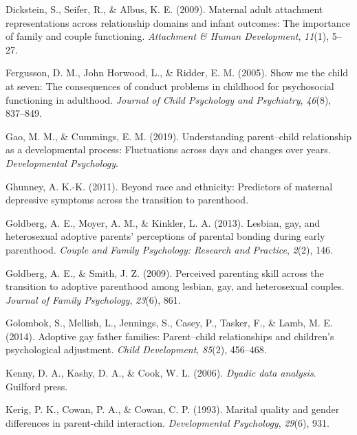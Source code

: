 \documentclass[man]{apa6}
\begin{document}
\leavevmode\hypertarget{ref-dickstein2009maternal}{}%
Dickstein, S., Seifer, R., \& Albus, K. E. (2009). Maternal adult attachment representations across relationship domains and infant outcomes: The importance of family and couple functioning. \emph{Attachment \& Human Development}, \emph{11}(1), 5--27.

\leavevmode\hypertarget{ref-fergusson2005show}{}%
Fergusson, D. M., John Horwood, L., \& Ridder, E. M. (2005). Show me the child at seven: The consequences of conduct problems in childhood for psychosocial functioning in adulthood. \emph{Journal of Child Psychology and Psychiatry}, \emph{46}(8), 837--849.

\leavevmode\hypertarget{ref-gao2019understanding}{}%
Gao, M. M., \& Cummings, E. M. (2019). Understanding parent--child relationship as a developmental process: Fluctuations across days and changes over years. \emph{Developmental Psychology}.

\leavevmode\hypertarget{ref-ghunney2011beyond}{}%
Ghunney, A. K.-K. (2011). Beyond race and ethnicity: Predictors of maternal depressive symptoms across the transition to parenthood.

\leavevmode\hypertarget{ref-goldberg2013lesbian}{}%
Goldberg, A. E., Moyer, A. M., \& Kinkler, L. A. (2013). Lesbian, gay, and heterosexual adoptive parents' perceptions of parental bonding during early parenthood. \emph{Couple and Family Psychology: Research and Practice}, \emph{2}(2), 146.

\leavevmode\hypertarget{ref-goldberg2009perceived}{}%
Goldberg, A. E., \& Smith, J. Z. (2009). Perceived parenting skill across the transition to adoptive parenthood among lesbian, gay, and heterosexual couples. \emph{Journal of Family Psychology}, \emph{23}(6), 861.

\leavevmode\hypertarget{ref-golombok2014adoptive}{}%
Golombok, S., Mellish, L., Jennings, S., Casey, P., Tasker, F., \& Lamb, M. E. (2014). Adoptive gay father families: Parent--child relationships and children's psychological adjustment. \emph{Child Development}, \emph{85}(2), 456--468.

\leavevmode\hypertarget{ref-apim}{}%
Kenny, D. A., Kashy, D. A., \& Cook, W. L. (2006). \emph{Dyadic data analysis}. Guilford press.

\leavevmode\hypertarget{ref-kerig1993marital}{}%
Kerig, P. K., Cowan, P. A., \& Cowan, C. P. (1993). Marital quality and gender differences in parent-child interaction. \emph{Developmental Psychology}, \emph{29}(6), 931.
\end{document}
